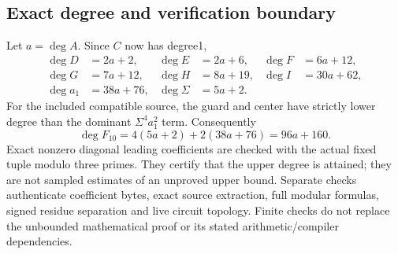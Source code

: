 \subsection{Exact degree and verification boundary}

Let $a=\deg A$. Since $C$ now has degree1,
\begin{align*}
 \deg D&=2a+2,& \deg E&=2a+6,& \deg F&=6a+12,\\
 \deg G&=7a+12,&\deg H&=8a+19,&\deg I&=30a+62,\\
 \deg a_1&=38a+76,&\deg\Sigma&=5a+2.
\end{align*}
For the included compatible source, the guard and center have strictly
lower degree than the dominant $\Sigma^4a_1^2$ term. Consequently
\[
 \deg F_{10}=4(5a+2)+2(38a+76)=96a+160.
\]
Exact nonzero diagonal leading coefficients are checked with the actual
fixed tuple modulo three primes. They certify that the upper degree is
attained; they are not sampled estimates of an unproved upper bound.
Separate checks authenticate coefficient bytes, exact source extraction,
full modular formulas, signed residue separation and live circuit topology.
Finite checks do not replace the unbounded mathematical proof or its
stated arithmetic/compiler dependencies.
